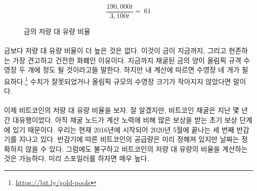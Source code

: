 \begin{figure}
	\centering
	\begin{equation}
		\frac{190,000 t}{3,100 t} = ~ 61
	\end{equation}
	\caption{금의 저량 대 유량 비율}
	\label{fig:stock-to-flow-gold}
\end{figure}

\paragraph{}
\begin{comment}	
	Nothing has a higher stock-to-flow ratio than gold. This is why gold, up to now,
	was the hardest, soundest money in existence. It is often said that all the gold
	mined so far would fit in two olympic-sized swimming pools. According to my
	calculations\footnote{\url{https://bit.ly/gold-pools}}, we would need four. So
	maybe this needs updating, or Olympic-sized swimming pools got smaller.
\end{comment}
금보다 저량 대 유량 비율이 더 높은 것은 없다. 
이것이 금이 지금까지, 그리고 현존하는 가장 견고하고 건전한 화폐인 이유이다. 
지금까지 채굴된 금의 양이 올림픽 규격 수영장 두 개에 정도 될 것이라고들 말한다.
하지만 내 계산에 따르면 수영장 네 개가 필요하다.\footnote{\url{https://bit.ly/gold-pools}}
수치가 잘못되었거나 올림픽 규모의 수영장 크기가 작아지지 않았다면 말이다.

\paragraph{}
\begin{comment}	
	Enter Bitcoin. As you probably know, bitcoin mining was all the rage in
	the last couple of years. This is because we are still in the early
	phases of what is called the \textit{reward era}, where mining nodes are
	rewarded with \textit{a lot} of bitcoin for their computational effort. We are
	currently in reward era number 3, which began in 2016 and will end in
	early 2020, probably in May. While the bitcoin supply is predetermined,
	the inner workings of Bitcoin only allow for approximate dates.
	Nevertheless, we can predict with certainty how high Bitcoin's
	stock-to-flow ratio will be. Spoiler alert: it will be high.
\end{comment}
이제 비트코인의 저량 대 유량 비율을 보자. 
잘 알겠지만, 비트코인 채굴은 지난 몇 년간 대유행이었다.
아직 채굴 노드가 계산 노력에 비해 많은 보상을 받는 초기 보상 단계에 있기 때문이다.
우리는 현재 2016년에 시작되어 2020년 5월에 끝나는 세 번째 반감기를 지나고 있다.
반감기에 따른 비트코인의 공급량은 미리 정해져 있지만 날짜는 정확하지 않을 수 있다.
그럼에도 불구하고 비트코인의 저량 대 유량의 비율을 계산하는 것은 가능하다.
미리 스포일러를 하자면 매우 높다.


